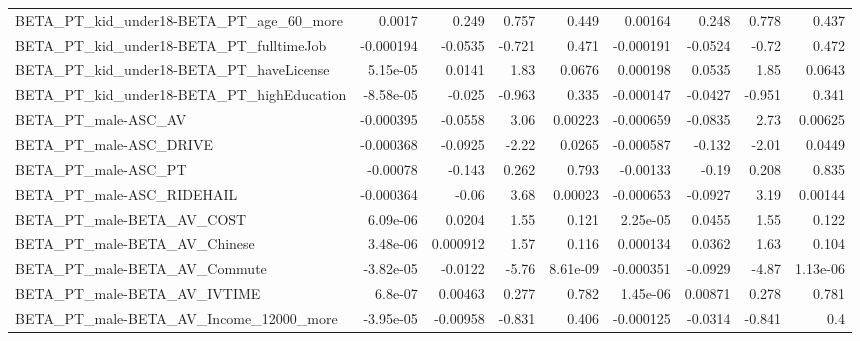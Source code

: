 \begin{tabular}{lrrrrrrrr}
BETA\_PT\_kid\_under18-BETA\_PT\_age\_60\_more            &      0.0017 &        0.249 &     0.757 &    0.449 &    0.00164 &       0.248 &        0.778 &         0.437 \\
BETA\_PT\_kid\_under18-BETA\_PT\_fulltimeJob            &   -0.000194 &      -0.0535 &    -0.721 &    0.471 &  -0.000191 &     -0.0524 &        -0.72 &         0.472 \\
BETA\_PT\_kid\_under18-BETA\_PT\_haveLicense            &    5.15e-05 &       0.0141 &      1.83 &   0.0676 &   0.000198 &      0.0535 &         1.85 &        0.0643 \\
BETA\_PT\_kid\_under18-BETA\_PT\_highEducation          &   -8.58e-05 &       -0.025 &    -0.963 &    0.335 &  -0.000147 &     -0.0427 &       -0.951 &         0.341 \\
BETA\_PT\_male-ASC\_AV                                &   -0.000395 &      -0.0558 &      3.06 &  0.00223 &  -0.000659 &     -0.0835 &         2.73 &       0.00625 \\
BETA\_PT\_male-ASC\_DRIVE                             &   -0.000368 &      -0.0925 &     -2.22 &   0.0265 &  -0.000587 &      -0.132 &        -2.01 &        0.0449 \\
BETA\_PT\_male-ASC\_PT                                &    -0.00078 &       -0.143 &     0.262 &    0.793 &   -0.00133 &       -0.19 &        0.208 &         0.835 \\
BETA\_PT\_male-ASC\_RIDEHAIL                          &   -0.000364 &        -0.06 &      3.68 &  0.00023 &  -0.000653 &     -0.0927 &         3.19 &       0.00144 \\
BETA\_PT\_male-BETA\_AV\_COST                          &    6.09e-06 &       0.0204 &      1.55 &    0.121 &   2.25e-05 &      0.0455 &         1.55 &         0.122 \\
BETA\_PT\_male-BETA\_AV\_Chinese                       &    3.48e-06 &     0.000912 &      1.57 &    0.116 &   0.000134 &      0.0362 &         1.63 &         0.104 \\
BETA\_PT\_male-BETA\_AV\_Commute                       &   -3.82e-05 &      -0.0122 &     -5.76 & 8.61e-09 &  -0.000351 &     -0.0929 &        -4.87 &      1.13e-06 \\
BETA\_PT\_male-BETA\_AV\_IVTIME                        &     6.8e-07 &      0.00463 &     0.277 &    0.782 &   1.45e-06 &     0.00871 &        0.278 &         0.781 \\
BETA\_PT\_male-BETA\_AV\_Income\_12000\_more             &   -3.95e-05 &     -0.00958 &    -0.831 &    0.406 &  -0.000125 &     -0.0314 &       -0.841 &           0.4 \\

\end{tabular}
